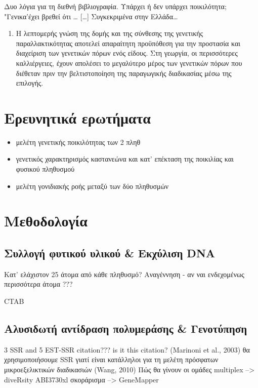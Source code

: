 \documentclass[12pt,a4paper,]{report}
\providecommand{\tightlist}{%
  \setlength{\itemsep}{0pt}\setlength{\parskip}{0pt}}
\begin{document}
Δυο λόγια για τη διεθνή βιβλιογραφία. Υπάρχει ή δεν υπάρχει ποικιλότητα;
"Γενικα'έχει βρεθεί ότι \ldots{} {[}\ldots{}{]} Συγκεκριμένα στην
Ελλάδα\ldots{}

\begin{enumerate}
\def\labelenumi{\arabic{enumi}.}
\tightlist
\item
  Η λεπτομερής γνώση της δομής και της σύνθεσης της γενετικής
  παραλλακτικότητας αποτελεί απαραίτητη προϋπόθεση για την προστασία και
  διαχείριση των γενετικών πόρων ενός είδους. Στη γεωργία, οι
  περισσότερες καλλιέργειες, έχουν απολέσει το μεγαλύτερο μέρος των
  γενετικών πόρων που διέθεταν πριν την βελτιστοποίηση της παραγωγικής
  διαδικασίας μέσω της επιλογής.
\end{enumerate}

\hypertarget{-}{%
\section{Ερευνητικά ερωτήματα}\label{-}}

\begin{itemize}
\tightlist
\item
  μελέτη γενετικής ποικιλότητας των 2 πληθ
\item
  γενετικός χαρακτηρισμός καστανεώνα και κατ' επέκταση της ποικιλίας και
  φυσικού πληθυσμού
\item
  μελέτη γονιδιακής ροής μεταξύ των δύο πληθυσμών
\end{itemize}

\section{Μεθοδολογία}

\hypertarget{----dna}{%
\subsection{Συλλογή φυτικού υλικού \& Εκχύλιση DNA}\label{----dna}}

Κατ' ελάχιστον 25 άτομα από κάθε πληθυσμό? Αναγέννηση - αν ναι
ενδεχομένως περισσότερα άτομα ???

CTAB

\hypertarget{---}{%
\subsection{Αλυσιδωτή αντίδραση πολυμεράσης \& Γενοτύπηση}\label{---}}

3 SSR and 5 EST-SSR citation??? is it this citation? (Marinoni et al.,
2003) θα χρησιμοποιήσουμε SSR γιατί είναι κατάλληλοι για τη μελέτη
πρόσφατων μικροεξελικτικών διαδικασιών (Wang, 2010) Πώς θα γίνουν οι
ομάδες multiplex --\textgreater{} diveRsity ABI3730xl σκοράρισμα
--\textgreater{} GeneMapper
\end{document}
